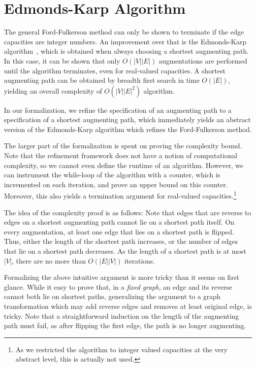 \documentclass{llncs}
\begin{document}
\section{Edmonds-Karp Algorithm}
  The general Ford-Fulkerson method can only be shown to terminate if the edge capacities are integer numbers. 
  An improvement over that is the Edmonds-Karp algorithm~\cite{}, which is obtained when always choosing 
  a shortest augmenting path. In this case, it can be shown that only $O(|V||E|)$ augmentations are performed until the
  algorithm terminates, even for real-valued capacities. A shortest augmenting path can be obtained by breadth first search in time $O(|E|)$,
  yielding an overall complexity of $O(|V||E|^2) $ algorithm.
  
  In our formalization, we refine the specification of an augmenting path to a specification of a shortest augmenting path, which immediately yields 
  an abstract version of the Edmonds-Karp algorithm which refines the Ford-Fulkerson method. 
  
  The larger part of the formalization is spent on proving the complexity bound. Note that the refinement framework does not 
  have a notion of computational complexity, so we cannot even define the runtime of an algorithm. However, we can instrument 
  the while-loop of the algorithm with a counter, which is incremented on each iteration, and prove an upper bound on this counter.
  Moreover, this also yields a termination argument for real-valued capacities.\footnote{As we restricted the algorithm 
  to integer valued capacities at the very abstract level, this is actually not used.}
  
  The idea of the complexity proof is as follows: Note that edges that are reverse to edges on a shortest augmenting path cannot lie 
  on a shortest path itself.
  On every augmentation, at least one edge that lies on a shortest path is flipped. Thus, either the length of the shortest path increases,
  or the number of edges that lie on a shortest path decreases. As the length of a shortest path is at most $|V|$, there are no more than $O(|E||V|)$ iterations.
  
  Formalizing the above intuitive argument is more tricky than it seems on first glance. 
  While it easy to prove that, in a \emph{fixed graph}, an edge and its reverse cannot both lie on shortest paths, generalizing the argument
  to a graph transformation which may add reverse edges and removes at least original edge, is tricky. Note that a straightforward induction
  on the length of the augmenting path must fail, as after flipping the first edge, the path is no longer augmenting.
  
\end{document}
